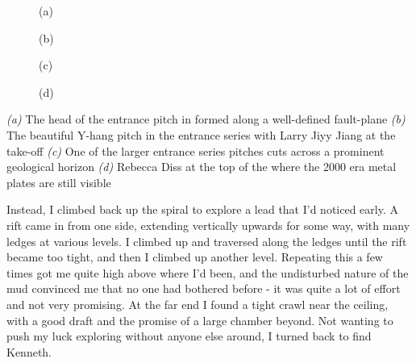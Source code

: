 \begin{pagefigure}
    \checkoddpage \ifoddpage \forcerectofloat \else \forceversofloat \fi
    \centering
    \begin{subfigure}[t]{0.681\textwidth}
        \centering
        \caption{(a)} \label{Traverse over buckwheat}
    \end{subfigure}
        \hfill
    \begin{subfigure}[t]{0.303\textwidth}
        \centering
         \caption{(b)}\label{passage in Deja VU}
    \end{subfigure}
    \vspace{0cm}

    \begin{subfigure}[t]{0.397\textwidth}
        \centering
        \caption{(c)} \label{Dejavu}
    \end{subfigure}
        \hfill
    \begin{subfigure}[t]{0.593\textwidth}
        \centering   
        \caption{(d)} \label{Dejavu}
    \end{subfigure}

    \caption{
        \textit{(a)} The head of the entrance pitch in \protect{} formed along a well-defined fault-plane
        \textit{(b)} The beautiful Y-hang pitch in the entrance series with Larry Jiyy Jiang at the take-off
        \textit{(c)} One of the larger entrance series pitches cuts across a prominent geological horizon
        \textit{(d)} Rebecca Diss at the top of the \protect{} where the 2000 era metal plates are still visible  }
\end{pagefigure}

Instead, I climbed back up the spiral to explore a lead that I'd noticed early. A rift came in from one side, extending vertically upwards for some way, with many ledges at various levels. I climbed up and traversed along the ledges until the rift became too tight, and then I climbed up another level. Repeating this a few times got me quite high above where I'd been, and the undisturbed nature of the mud convinced me that no one had bothered before - it was quite a lot of effort and not very promising. At the far end I found a tight crawl near the ceiling, with a good draft and the promise of a large chamber beyond. Not wanting to push my luck exploring without anyone else around, I turned back to find Kenneth.

